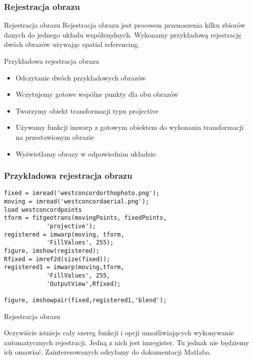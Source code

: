 \documentclass{beamer}
\begin{document}
\begin{frame}
\frametitle{Rejestracja obrazu}
\begin{block}{Rejestracja obrazu}
Rejestracja obrazu jest procesem przenoszenia kilku zbiorów danych do jednego układu współrzędnych.
Wykonamy przykładową rejestrację dwóch obrazów używając spatial referencing.
\end{block}
\end{frame}

\begin{frame}{Przykładowa rejestracja obrazu}

\begin{itemize}
	\item Odczytanie dwóch przykładowych obrazów
	\item Wczytujemy gotowe wspólne punkty dla obu obrazów
	\item Tworzymy obiekt transformacji typu projective
	\item Używamy funkcji imwarp z gotowym obiektem do wykonania transformacji na przestawionym obrazie
	\item Wyświetlamy obrazy w odpowiednim układzie
\end{itemize}

\end{frame}

\begin{frame}[fragile]
\frametitle{Przykładowa rejestracja obrazu}
\begin{example}
\begin{lstlisting}
fixed = imread('westconcordorthophoto.png');
moving = imread('westconcordaerial.png');
load westconcordpoints
tform = fitgeotrans(movingPoints, fixedPoints, 
			'projective');
registered = imwarp(moving, tform,
			'FillValues', 255);
figure, imshow(registered);
Rfixed = imref2d(size(fixed));
registered1 = imwarp(moving,tform,
			'FillValues', 255,
			'OutputView',Rfixed);
				
figure, imshowpair(fixed,registered1,'blend');
\end{lstlisting}
\end{example}

\end{frame}

\begin{frame}{Rejestracja obrazu}
\begin{block}
Oczywiście istnieje cały szereg funkcji i opcji umożliwiających wykonywanie automatycznych rejestracji. Jedną z nich jest imregister. Tu jednak nie będziemy ich omawiać. Zainteresowanych odsyłamy do dokumentacji Matlaba.
\end{block}
\end{frame}
\end{document}
